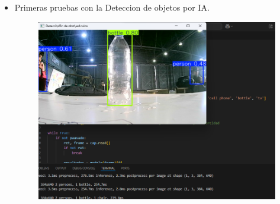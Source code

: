 \documentclass[12pt,a4paper]{article}
\begin{document}
\begin{itemize}
\item Primeras pruebas con la Deteccion de objetos por IA.

\begin{figure}
    \centering
    \includegraphics[width=0.5\linewidth]{Carpeta de campo/Deteccioncam.png}
\end{figure}


\end{itemize}
\end{document}
